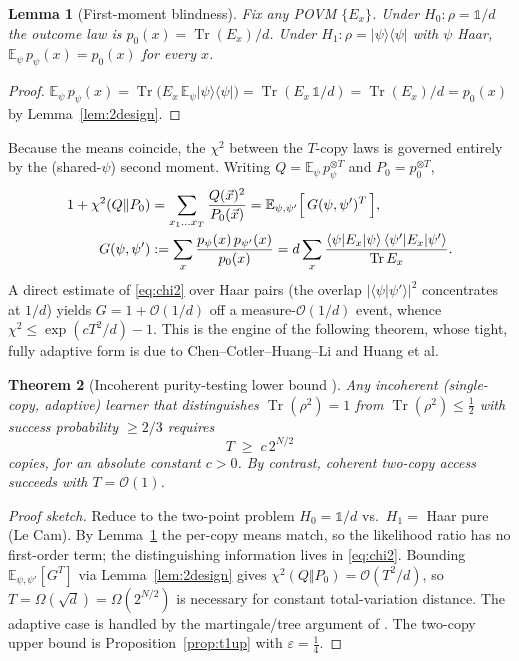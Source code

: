 \documentclass[11pt]{article}
\theoremstyle{plain}
\newtheorem{theorem}{Theorem}[section]
\newtheorem{lemma}[theorem]{Lemma}
\theoremstyle{definition}
\theoremstyle{remark}
\newcommand{\Tr}{\operatorname{Tr}}
\newcommand{\id}{\mathbb{1}}
\newcommand{\E}{\mathbb{E}}
\newcommand{\ket}[1]{\lvert #1 \rangle}
\newcommand{\bra}[1]{\langle #1 \rvert}
\newcommand{\braket}[2]{\langle #1 \vert #2 \rangle}
\newcommand{\proj}[1]{\lvert #1 \rangle\!\langle #1 \rvert}
\newcommand{\eps}{\varepsilon}
\newcommand{\bigO}{\mathcal{O}}
\begin{document}
\begin{lemma}[First-moment blindness]\label{lem:blind}
Fix any POVM $\{E_x\}$. Under $H_0:\rho=\id/d$ the outcome law is $p_0(x)=\Tr(E_x)/d$. Under $H_1:\rho=\proj\psi$ with $\psi$ Haar, $\E_\psi\,p_\psi(x)=p_0(x)$ for every $x$.
\end{lemma}
\begin{proof}
$\E_\psi\,p_\psi(x)=\Tr\!\big(E_x\,\E_\psi\proj\psi\big)=\Tr(E_x\,\id/d)=\Tr(E_x)/d=p_0(x)$ by Lemma~\ref{lem:2design}.\end{proof}

Because the means coincide, the $\chi^2$ between the $T$-copy laws is governed entirely by the (shared-$\psi$) second moment. Writing $Q=\E_\psi\,p_\psi^{\otimes T}$ and $P_0=p_0^{\otimes T}$,
\begin{align}
1+\chi^2(Q\Vert P_0)
&=\sum_{x_1\dots x_T}\frac{Q(\vec x)^2}{P_0(\vec x)}
=\E_{\psi,\psi'}\Big[\,G(\psi,\psi')^{T}\,\Big],\notag\\
G(\psi,\psi')&:=\sum_x\frac{p_\psi(x)\,p_{\psi'}(x)}{p_0(x)}
=d\sum_x\frac{\bra\psi E_x\ket\psi\,\bra{\psi'}E_x\ket{\psi'}}{\Tr E_x}.
\label{eq:chi2}
\end{align}
A direct estimate of \eqref{eq:chi2} over Haar pairs (the overlap $|\braket{\psi}{\psi'}|^2$ concentrates at $1/d$) yields $G=1+\bigO(1/d)$ off a measure-$\bigO(1/d)$ event, whence $\chi^2\le \exp(cT^2/d)-1$. This is the engine of the following theorem, whose tight, fully adaptive form is due to Chen--Cotler--Huang--Li and Huang et al.

\begin{theorem}[Incoherent purity-testing lower bound \cite{CCHL,LearnExp}]\label{thm:t1low}
Any incoherent (single-copy, adaptive) learner that distinguishes $\Tr(\rho^2)=1$ from $\Tr(\rho^2)\le\tfrac12$ with success probability $\ge 2/3$ requires
\begin{equation}
T\;\ge\;c\,2^{N/2}
\end{equation}
copies, for an absolute constant $c>0$. By contrast, coherent two-copy access succeeds with $T=\bigO(1)$.
\end{theorem}
\begin{proof}[Proof sketch]
Reduce to the two-point problem $H_0=\id/d$ vs.\ $H_1=$ Haar pure (Le Cam). By Lemma~\ref{lem:blind} the per-copy means match, so the likelihood ratio has no first-order term; the distinguishing information lives in \eqref{eq:chi2}. Bounding $\E_{\psi,\psi'}[G^T]$ via Lemma~\ref{lem:2design} gives $\chi^2(Q\Vert P_0)=\bigO(T^2/d)$, so $T=\Omega(\sqrt d)=\Omega(2^{N/2})$ is necessary for constant total-variation distance. The adaptive case is handled by the martingale/tree argument of \cite{CCHL}. The two-copy upper bound is Proposition~\ref{prop:t1up} with $\eps=\tfrac14$.\end{proof}
\end{document}
